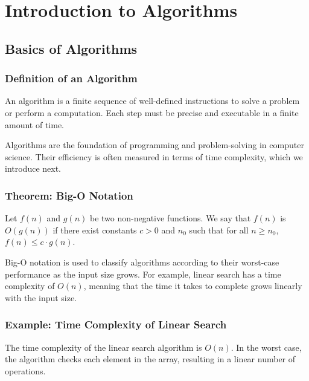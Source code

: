 \chapter{Introduction to Algorithms}

\section{Basics of Algorithms}

\subsection{Definition of an Algorithm}
\begin{defi}
An algorithm is a finite sequence of well-defined instructions to solve a problem or perform a computation. Each step must be precise and executable in a finite amount of time.
\end{defi}

Algorithms are the foundation of programming and problem-solving in computer science. Their efficiency is often measured in terms of time complexity, which we introduce next.

\subsection{Theorem: Big-O Notation}
\begin{theorem}
Let $f(n)$ and $g(n)$ be two non-negative functions. We say that $f(n)$ is $O(g(n))$ if there exist constants $c > 0$ and $n_0$ such that for all $n \geq n_0$, $f(n) \leq c \cdot g(n)$.
\end{theorem}

Big-O notation is used to classify algorithms according to their worst-case performance as the input size grows. For example, linear search has a time complexity of $O(n)$, meaning that the time it takes to complete grows linearly with the input size.

\subsection{Example: Time Complexity of Linear Search}
\begin{example}
The time complexity of the linear search algorithm is $O(n)$. In the worst case, the algorithm checks each element in the array, resulting in a linear number of operations.
\end{example}

